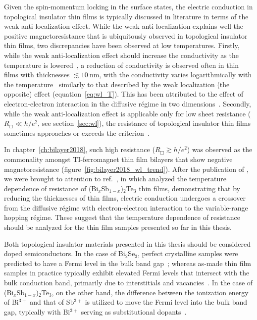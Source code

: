 Given the spin-momentum locking in the surface states, the electric conduction in topological insulator thin films is typically discussed in literature in terms of the weak anti-localization effect. While the weak anti-localization explains well the positive magnetoresistance that is ubiquitously observed in topological insulator thin films, two discrepancies have been observed at low temperatures. Firstly, while the weak anti-localization effect should increase the conductivity as the temperature is lowered~\cite{bergmann1984}, a reduction of conductivity is observed often in thin films with thicknesses $\lesssim 10~\mathrm{nm}$, with the conductivity varies logarithmically with the temperature~\cite{Chen2011, Liu2011, Roy2013} similarly to that described by the weak localization (the opposite) effect (equation~\ref{eq:wl_T}). This has been attributed to the effect of electron-electron interaction in the diffusive r\'egime in two dimensions~\cite{WL_ee}. Secondly, while the weak anti-localization effect is applicable only for low sheet resistance ($R_\Box \ll h/e^2$, see section~\ref{sec:wl}), the resistance of topological insulator thin films sometimes approaches or exceeds the criterion~\cite{TI_WAL_thickness, ZhangJS2011}.

In chapter~\ref{ch:bilayer2018}, such high resistance ($R_\Box \gtrsim h/e^2$) was observed as the commonality amongst TI-ferromagnet thin film bilayers that show negative magnetoresistance (figure~\ref{fig:bilayer2018_wl_trend}). After the publication of \cite{bilayer2018}, we were brought to attention to ref.~\cite{liao2015}, in which \citeauthor{liao2015} analyzed the temperature dependence of resistance of (Bi$_x$Sb$_{1-x}$)$_2$Te$_3$ thin films, demonstrating that by reducing the thicknesses of thin films, electric conduction undergoes a crossover from the diffusive r\'egime with electron-electron interaction to the variable-range hopping r\'egime. These suggest that the temperature dependence of resistance should be analyzed for the thin film samples presented so far in this thesis.

Both topological insulator materials presented in this thesis should be considered doped semiconductors. In the case of Bi$_2$Se$_3$, perfect crystalline samples were predicted to have a Fermi level in the bulk band gap~\cite{TI_electronic_structure_zhang}; whereas as-made thin film samples in practice typically exhibit elevated Fermi levels that intersect with the bulk conduction band, primarily due to interstitials and vacancies~\cite{TI_ARPES1, ARPES_thickness, zhangli2013, Zhanybek3, Fisher2010}. In the case of (Bi$_x$Sb$_{1-x}$)$_2$Te$_3$, on the other hand, the difference between the ionization energy of Bi$^{3+}$ and that of Sb$^{3+}$ is utilized to move the Fermi level into the bulk band gap, typically with Bi$^{3+}$ serving as substitutional dopants~\cite{ZhangJS2011, TI_electronic_structure_zhang}.

